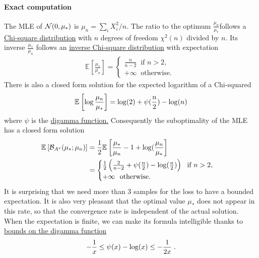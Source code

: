 \documentclass{article}
\newenvironment{example}{
	\begin{mdframed}[backgroundcolor=light-gray, roundcorner=5pt]
}{		
	\end{mdframed}
}
\newcommand*{\expect}[2][]{\ensuremath{\mathbb{E}_{#1} \left[ #2 \right] }} %
\newcommand{\logpart}{A}
\newcommand{\bregmanconj}{\cB_{\logpart^*}}
\begin{document}
\begin{example}
	\paragraph{Exact computation}
	The MLE of ${\mathcal N}(0,\mu_*)$ is $\mu_n = \sum_i X_i^2 /n$. The ratio to the optimum  $\frac{\mu_n}{\mu_*}$follows a \href{https://en.wikipedia.org/wiki/Chi-square_distribution}{Chi-square distribution} with $n$ degrees of freedom $\chi^2(n)$ divided by $n$. Its inverse $\frac{\mu_*}{ \mu_n} $ follows an \href{https://en.wikipedia.org/wiki/Inverse-chi-squared_distribution}{inverse Chi-square distribution} with expectation 
	\begin{align}
		\expect{\frac{\mu_*}{ \mu_n} } =
		\begin{cases}
			\frac{n}{n-2} \ \text{ if } n>2, \\
			+\infty \  \text{ otherwise. }
		\end{cases}
	\end{align}
	There is also a closed form solution for the expected logarithm of a Chi-squared\citep{pav2015moments}
	\begin{align}
		\expect{\log \frac{\mu_n}{\mu_*}} = \log(2) + \psi(\half[n]) - \log(n)
	\end{align}
	where $\psi$ is the \href{https://en.wikipedia.org/wiki/Digamma_function}{digamma function.}
	Consequently the suboptimality of the MLE has a closed form solution
	\begin{align}
	\expect{\bregmanconj( \mu_*; \mu_n) }
	&= \half \expect{\frac{\mu_*}{ \mu_n} - 1 + \log(\frac{\mu_n}{\mu_*} } \\
	& =
	\begin{cases}
		\half \left ( \frac{2}{n-2} +\psi(\half[n]) - \log(\half[n]) \right )  \ \text{ if } n>2, \\
			+\infty \  \text{ otherwise. }
	\end{cases}
	\end{align}
	It is surprising that we need more than $3$ samples for the loss to have a bounded expectation. 
	It is also very pleasant that the optimal value $\mu_*$ does not appear in this rate, so that the convergence rate is independent of the actual solution.
	When the expectation is finite, we can make its formula intelligible thanks to \href{https://en.wikipedia.org/wiki/Digamma_function#Inequalities}{bounds on the digamma function}
	\begin{align}
		-\frac{1}{x} \leq \psi(x) - \log(x) \leq -\frac{1}{2x}	\; .
	\end{align}

\end{example}
\end{document}
